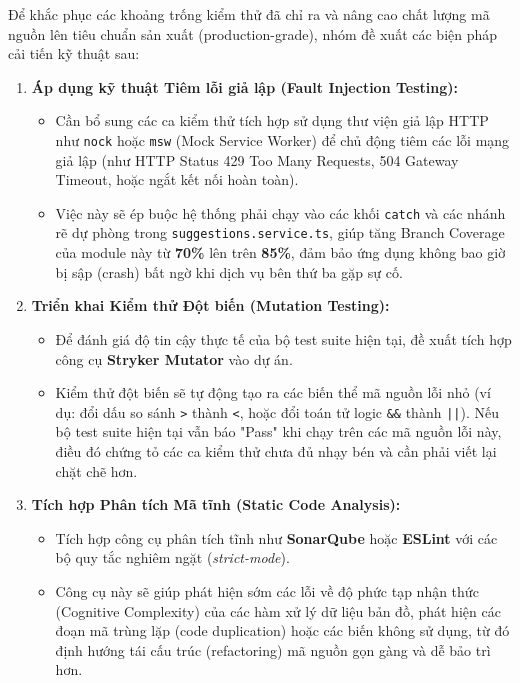 Để khắc phục các khoảng trống kiểm thử đã chỉ ra và nâng cao chất lượng mã nguồn lên tiêu chuẩn sản xuất (production-grade), nhóm đề xuất các biện pháp cải tiến kỹ thuật sau:

\begin{enumerate}
    \item \textbf{Áp dụng kỹ thuật Tiêm lỗi giả lập (Fault Injection Testing):}
    \begin{itemize}
        \item Cần bổ sung các ca kiểm thử tích hợp sử dụng thư viện giả lập HTTP như \texttt{nock} hoặc \texttt{msw} (Mock Service Worker) để chủ động tiêm các lỗi mạng giả lập (như HTTP Status 429 Too Many Requests, 504 Gateway Timeout, hoặc ngắt kết nối hoàn toàn).
        \item Việc này sẽ ép buộc hệ thống phải chạy vào các khối \texttt{catch} và các nhánh rẽ dự phòng trong \texttt{suggestions.service.ts}, giúp tăng Branch Coverage của module này từ \textbf{70\%} lên trên \textbf{85\%}, đảm bảo ứng dụng không bao giờ bị sập (crash) bất ngờ khi dịch vụ bên thứ ba gặp sự cố.
    \end{itemize}
    
    \item \textbf{Triển khai Kiểm thử Đột biến (Mutation Testing):}
    \begin{itemize}
        \item Để đánh giá độ tin cậy thực tế của bộ test suite hiện tại, đề xuất tích hợp công cụ \textbf{Stryker Mutator} vào dự án. 
        \item Kiểm thử đột biến sẽ tự động tạo ra các biến thể mã nguồn lỗi nhỏ (ví dụ: đổi dấu so sánh \texttt{>} thành \texttt{<}, hoặc đổi toán tử logic \texttt{\&\&} thành \texttt{||}). Nếu bộ test suite hiện tại vẫn báo "Pass" khi chạy trên các mã nguồn lỗi này, điều đó chứng tỏ các ca kiểm thử chưa đủ nhạy bén và cần phải viết lại chặt chẽ hơn.
    \end{itemize}

    \item \textbf{Tích hợp Phân tích Mã tĩnh (Static Code Analysis):}
    \begin{itemize}
        \item Tích hợp công cụ phân tích tĩnh như \textbf{SonarQube} hoặc \textbf{ESLint} với các bộ quy tắc nghiêm ngặt (\textit{strict-mode}).
        \item Công cụ này sẽ giúp phát hiện sớm các lỗi về độ phức tạp nhận thức (Cognitive Complexity) của các hàm xử lý dữ liệu bản đồ, phát hiện các đoạn mã trùng lặp (code duplication) hoặc các biến không sử dụng, từ đó định hướng tái cấu trúc (refactoring) mã nguồn gọn gàng và dễ bảo trì hơn.
    \end{itemize}


\end{enumerate}
